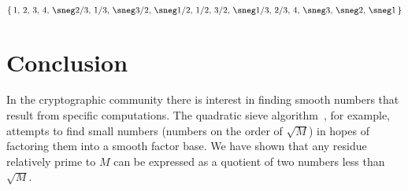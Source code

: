 \documentclass[submission,copyright,creativecommons]{eptcs}
\begin{document}
\[
\{
\,1,\,2,\,3,\,4,\,\sneg2/3,\,1/3,\,\sneg3/2,\,\sneg1/2,\,1/2,\,3/2,\,\sneg1/3,\,2/3,\,4,\,\sneg3,\,\sneg2,\,\sneg1\,
\}
\]

\section{Conclusion}

In the cryptographic community there is interest in finding smooth
numbers that result from specific computations.  The quadratic sieve
algorithm~\cite{Sieve}, for example, attempts to find small numbers (numbers on the
order of $\sqrt{M}$) in hopes of factoring them into a smooth factor
base.  We have shown that any residue relatively prime to $M$ can be
expressed as a quotient of two numbers less than $\sqrt{M}$.

{}

\end{document}

